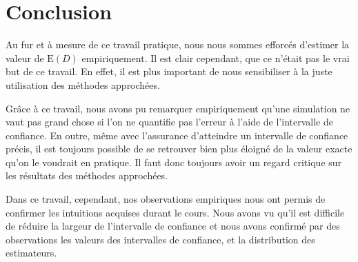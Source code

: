 \documentclass[paper=a4, fontsize=11pt]{scrartcl}
\begin{document}
\section{Conclusion}

Au fur et à mesure de ce travail pratique, nous nous sommes efforcés d'estimer la valeur de $\text{E}(D)$ empiriquement. Il est clair cependant, que ce n'était pas le vrai but de ce travail. En effet, il est plus important de nous sensibiliser à la juste utilisation des méthodes approchées.

Grâce à ce travail, nous avons pu remarquer empiriquement qu'une simulation ne vaut pas grand chose si l'on ne quantifie pas l'erreur à l'aide de l'intervalle de confiance. En outre, même avec l'assurance d'atteindre un intervalle de confiance précis, il est toujours possible de se retrouver bien plus éloigné de la valeur exacte qu'on le voudrait en pratique. Il faut donc toujours avoir un regard critique sur les résultats des méthodes approchées.

Dans ce travail, cependant, nos observations empiriques nous ont permis de confirmer les intuitions acquises durant le cours. Nous avons vu qu'il est difficile de réduire la largeur de l'intervalle de confiance et nous avons confirmé par des observations les valeurs des intervalles de confiance, et la distribution des estimateurs.
\end{document}

